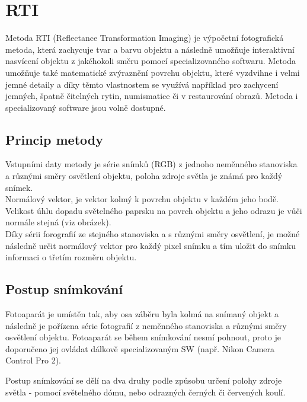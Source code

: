 \chapter{RTI}
\label{4-RTI}

Metoda RTI (Reflectance Transformation Imaging) je výpočetní fotografická metoda, která zachycuje tvar a barvu objektu a následně umožňuje interaktivní nasvícení objektu z jakéhokoli směru pomocí specializovaného softwaru. Metoda umožňuje také matematické zvýraznění povrchu objektu, které vyzdvihne i velmi jemné detaily a díky těmto vlastnostem se využívá například pro zachycení jemných, špatně čitelných rytin, numismatice či v restaurování obrazů. Metoda i specializovaný software jsou volně dostupné.

\section{Princip metody}

Vstupními daty metody je série snímků (RGB) z jednoho neměnného stanoviska a různými směry osvětlení objektu, poloha zdroje světla je známá pro každý snímek.  \\ 

Normálový vektor, je vektor kolmý k povrchu objektu v každém jeho bodě. Velikost úhlu dopadu světelného paprsku na povrch objektu a jeho odrazu je vůči normále stejná (viz obrázek). \\


Díky sérii forografií ze stejného stanoviska a s různými směry osvětlení, je možné následně určit normálový vektor pro každý pixel snímku a tím uložit do snímku informaci o třetím rozměru objektu.\\

\section{Postup snímkování}

Fotoaparát je umístěn tak, aby osa záběru byla kolmá na snímaný objekt a následně je pořízena série fotografií z neměnného stanoviska a různými směry osvětlení objektu. Fotoaparát se během snímkování nesmí pohnout, proto je doporučeno jej ovládat dálkově specializovaným SW (např. Nikon Camera Control Pro 2).

Postup snímkování se dělí na dva druhy podle způsobu určení polohy zdroje světla - pomocí světelného dómu, nebo odrazných černých či červených koulí.

